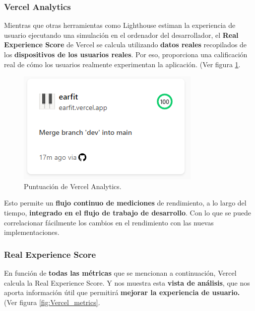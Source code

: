 \documentclass[12pt,twoside,titlepage]{report}
\begin{document}
{\subsubsection{Vercel Analytics}

Mientras que otras herramientas como Lighthouse estiman la experiencia de usuario ejecutando una simulación en el ordenador del desarrollador, el \textbf{Real Experience Score} de Vercel se calcula utilizando \textbf{datos reales} recopilados de los \textbf{dispositivos de los usuarios reales}. Por eso, proporciona una calificación real de cómo los usuarios realmente experimentan la aplicación.
(Ver figura \ref{fig:Vercel_metrics_resume}.

\begin{figure}[H]
    \centering
    \includegraphics[scale=0.8]{Vercel/VercelAnalyticsResume}
    \caption{Puntuación de Vercel Analytics.}
    \label{fig:Vercel_metrics_resume}
\end{figure}

Esto permite un \textbf{flujo continuo de mediciones} de rendimiento, a lo largo del tiempo, \textbf{integrado en el flujo de trabajo de desarrollo}. Con lo que se puede correlacionar fácilmente los cambios en el rendimiento con las nuevas implementaciones.

\subsubsection{Real Experience Score}

En función de \textbf{todas las métricas} que se mencionan a continuación, Vercel calcula la Real Experience Score. Y nos muestra esta \textbf{vista de análisis}, que nos aporta información útil que permitirá \textbf{mejorar la experiencia de usuario.}
(Ver figura \ref{fig:Vercel_metrics}.

}
\end{document}
